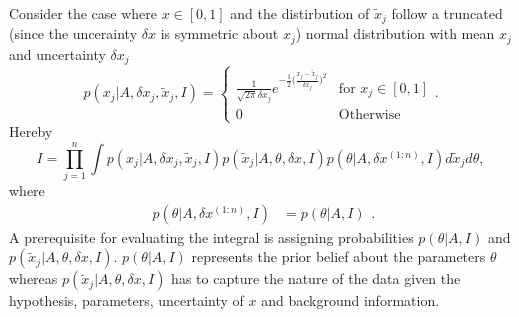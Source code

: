\begin{example}
	Consider the case where $x \in [0,1]$ and the distirbution of $\tilde{x}_j$ follow a truncated (since the uncerainty $\delta x$ is symmetric about $x_j$) normal distribution with mean $x_j$ and uncertainty $\delta x_j$\label{ex:BF1}
	\begin{equation}
		p(x_j|A,\delta x_j, \tilde{x}_j, I) = \begin{cases}
			\frac{1}{\sqrt{2\pi}\delta x_j}e^{-\frac{1}{2}\big(\frac{x_j-\tilde{x}_j}{\delta x_j}\big)^2} & \text{for  } x_j\in [0,1]\\
			0 & \text{Otherwise} 
		\end{cases}.
	\end{equation} 
	Hereby
	\begin{equation}
		I = \prod_{j=1}^n\int p(x_j|A,\delta x_j, \tilde{x}_j, I)p(\tilde{x}_j|A,\theta,\delta x, I)p(\theta|A,\delta x^{(1:n)},I) d\tilde{x}_j d\theta,
	\end{equation}
	where
	\begin{equation}
		\begin{split}
			p(\theta|A,\delta x^{(1:n)},I)
			& =  p(\theta|A,I)
		\end{split}.
	\end{equation}
	A prerequisite for evaluating the integral is assigning probabilities $p(\theta|A,I)$ and $p(\tilde{x}_j|A,\theta,\delta x, I)$. $p(\theta|A,I)$ represents the prior belief about the parameters $\theta$ whereas $p(\tilde{x}_j|A,\theta,\delta x, I)$ has to capture the nature of the data given the hypothesis, parameters, uncertainty of $x$ and background information. 
	

\end{example}
